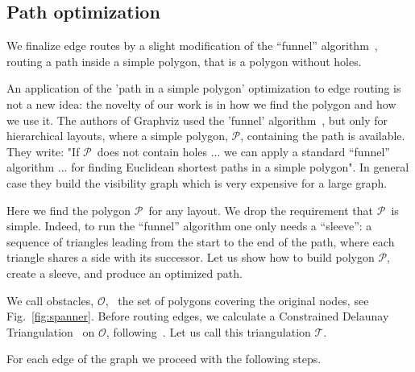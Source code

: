 \documentclass{gd-llncs}
\newcommand{\plg}{$\mathcal{P}$}
\begin{document}
\subsection{Path optimization} {
We finalize edge routes by a slight modification of the “funnel” algorithm~\cite{chazelle1982theorem,hershberger1994computing}, routing a path inside a simple polygon, that is a polygon without holes.

An application of the 'path in a simple polygon' optimization to edge routing is not a new idea: the novelty of our work is in how we find the polygon and how we use it.
The authors of Graphviz used the 'funnel' algorithm~\cite{dobkin1997implementing}, but only for hierarchical layouts, where a simple polygon, \plg, containing the path is available. They write: "If \plg~does not contain holes ... we can apply a
standard “funnel” algorithm ... for finding Euclidean shortest paths in a simple polygon". In general case they build the visibility graph which is very expensive for a large graph.

Here we find the polygon \plg~for any layout. We drop the requirement that \plg~is simple. Indeed, to run the “funnel” algorithm one only needs a “sleeve”: a sequence of triangles leading from the start to the end of the path, where each triangle shares a side with its successor. Let us show how to build polygon \plg, create a sleeve, and produce an optimized path.

We call obstacles, $\mathcal{O}$, ~the set of polygons covering the original nodes, see Fig.~\ref{fig:spanner}. Before routing edges, we calculate a Constrained Delaunay Triangulation~\cite{delaunay1934sphere} on $\mathcal{O}$, following~\cite{domiter2008sweep}. Let us call this triangulation $\mathcal{T}$.

For each edge of the graph we proceed with the following steps.

}
\end{document}
